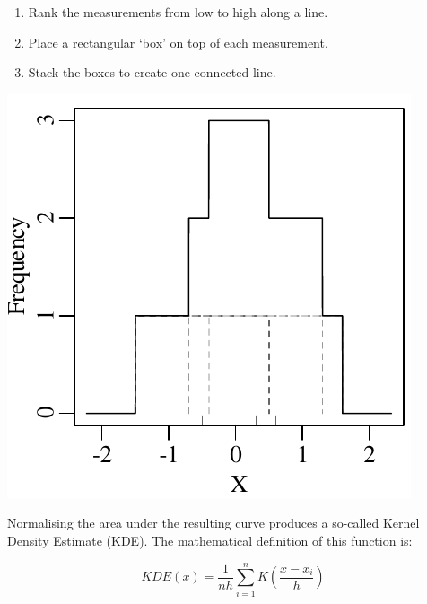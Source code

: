 \begin{enumerate}
\item Rank the measurements from low to high along a line.
\item Place a rectangular `box' on top of each measurement.
\item Stack the boxes to create one connected line.
\end{enumerate}

\noindent\begin{minipage}[t][][b]{.3\textwidth}
  \includegraphics[width=\textwidth]{../figures/rectKDE.pdf}
\end{minipage}
\begin{minipage}[t][][t]{.7\textwidth}
  \label{fig:rectangles}
\end{minipage}

Normalising the area under the resulting curve produces a so-called
Kernel Density Estimate (KDE). The mathematical definition of this
function is:

\begin{equation}
  KDE(x) = \frac{1}{nh} \sum\limits_{i=1}^{n} K\!\left(\frac{x-x_i}{h}\right)
\end{equation}

